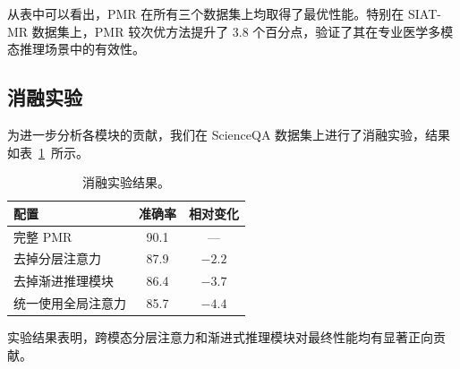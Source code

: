 从表中可以看出，PMR 在所有三个数据集上均取得了最优性能。特别在 SIAT-MR 数据集上，PMR 较次优方法提升了 3.8 个百分点，验证了其在专业医学多模态推理场景中的有效性。

\subsection{消融实验}

为进一步分析各模块的贡献，我们在 ScienceQA 数据集上进行了消融实验，结果如表~\ref{tab:ablation}~所示。

\begin{table}[htbp]
  \centering
  \caption{消融实验结果。}
  \label{tab:ablation}
  \begin{tabular}{lcc}
    \toprule
    \textbf{配置} & \textbf{准确率} & \textbf{相对变化} \\
    \midrule
    完整 PMR & 90.1 & — \\
    \quad 去掉分层注意力 & 87.9 & $-2.2$ \\
    \quad 去掉渐进推理模块 & 86.4 & $-3.7$ \\
    \quad 统一使用全局注意力 & 85.7 & $-4.4$ \\
    \bottomrule
  \end{tabular}
\end{table}

实验结果表明，跨模态分层注意力和渐进式推理模块对最终性能均有显著正向贡献。
